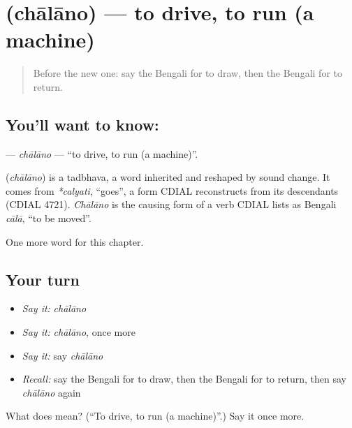 \section[\texorpdfstring{\bn{চালানো} (chālāno)}{চালানো (chālāno)}]{ (chālāno) — to drive, to run (a machine)}

\label{lesson:BN-C106-chalano}



\begin{quote}
Before the new one: say the Bengali for to draw, then the Bengali for to return.
\end{quote}

\subsection*{You'll want to know: }
\textbf{} — \emph{chālāno} — \textquotedblleft{}to drive, to run (a machine)\textquotedblright{}.

\begin{cousinweb}
\textbf{} (\emph{chālāno}) is a tadbhava, a word inherited and reshaped by sound change. It comes from \emph{*calyati}, \textquotedblleft{}goes\textquotedblright{}, a form CDIAL reconstructs from its descendants (CDIAL 4721). \emph{Chālāno} is the causing form of a verb CDIAL lists as Bengali \emph{cālā}, \textquotedblleft{}to be moved\textquotedblright{}.
\end{cousinweb}

\begin{grammarlens}[title={What you've built}]
One more word for this chapter.
\end{grammarlens}

\subsection*{Your turn}
\begin{itemize}
\raggedright
  \item \emph{Say it:} \emph{chālāno}
  \item \emph{Say it:} \emph{chālāno}, once more
  \item \emph{Say it:} say \emph{chālāno}
  \item \emph{Recall:} say the Bengali for to draw, then the Bengali for to return, then say \emph{chālāno} again
\end{itemize}

\begin{tcolorbox}[breakable,colback=teal!4,colframe=teal!35!black,title={Before you move on}]
What does  mean? (\textquotedblleft{}To drive, to run (a machine)\textquotedblright{}.) Say it once more.
\end{tcolorbox}
